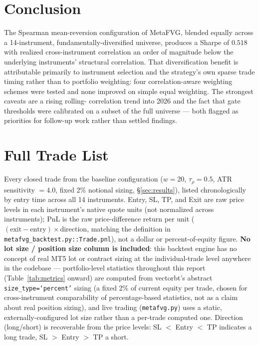 \documentclass[11pt]{article}
\begin{document}
\section{Conclusion}
The Spearman mean-reversion configuration of MetaFVG, blended equally across a 14-instrument,
fundamentally-diversified universe, produces a Sharpe of $0.518$ with realized cross-instrument
correlation an order of magnitude below the underlying instruments' structural correlation. That
diversification benefit is attributable primarily to instrument selection and the strategy's own
sparse trade timing rather than to portfolio weighting: four correlation-aware weighting schemes were
tested and none improved on simple equal weighting. The strongest caveats are a rising rolling-
correlation trend into 2026 and the fact that gate thresholds were calibrated on a subset of the full
universe --- both flagged as priorities for follow-up work rather than settled findings.

\appendix
\section{Full Trade List}
\label{sec:appendix-trades}
Every closed trade from the baseline configuration ($w=20$, $\tau_\rho=0.5$, ATR sensitivity $=4.0$,
fixed 2\% notional sizing, \S\ref{sec:results}), listed chronologically by entry time across all 14
instruments. Entry, SL, TP, and Exit are raw price levels in each instrument's native quote units
(not normalized across instruments); PnL is the raw price-difference return per unit
($(\text{exit}-\text{entry})\times\text{direction}$, matching the definition in
\texttt{metafvg\_backtest.py::Trade.pnl}), not a dollar or percent-of-equity figure. \textbf{No lot
size / position size column is included}: this backtest engine has no concept of real MT5 lot or
contract sizing at the individual-trade level anywhere in the codebase --- portfolio-level statistics
throughout this report (Table~\ref{tab:metrics} onward) are computed from vectorbt's abstract
\texttt{size\_type=`percent'} sizing (a fixed 2\% of current equity per trade, chosen for
cross-instrument comparability of percentage-based statistics, not as a claim about real position
sizing), and live trading (\texttt{metafvg.py}) uses a static, externally-configured lot size rather
than a per-trade computed one. Direction (long/short) is recoverable from the price levels: SL $<$
Entry $<$ TP indicates a long trade, SL $>$ Entry $>$ TP a short.


\end{document}
